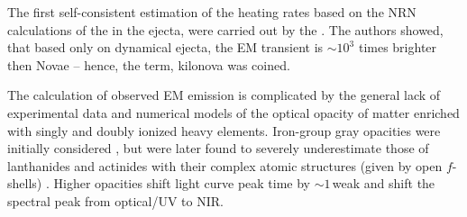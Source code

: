 The first self-consistent estimation of the heating rates based on the \ac{NRN} 
calculations of the \rproc{} in the ejecta, were carried out by the \citet{Metzger:2010}. 
The authors showed, that based only on dynamical ejecta, the \ac{EM} transient is ${\sim}10^3$ 
times brighter then Novae -- hence, the term, kilonova was coined. 
%
%

The calculation of observed \ac{EM} emission is complicated by the %
general lack of experimental data and numerical models of the optical opacity 
of matter enriched with singly and doubly ionized heavy \rproc{} elements. 
Iron-group gray opacities were initially considered \citep{Roberts:2011}, 
but were later found to severely underestimate those of 
lanthanides and actinides with their 
complex atomic structures (given by open $f$-shells) 
\citep{Kasen:2013xka,Tanaka:2013ana}. 
%
Higher opacities shift light curve peak time by ${\sim}1\,$weak \citep{Barnes:2013wka} 
and shift the spectral peak from optical/\ac{UV} to \ac{NIR}.


